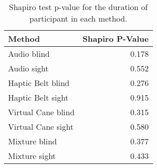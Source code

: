 
\begin{table}[!htb]
\centering
\caption{Shapiro test p-value for the duration of participant in each method.}
\label{tab:shapiro_duration}
\begin{tabular}{lr}
\toprule
            Method &  Shapiro P-Value \\
\midrule
       Audio blind &            0.178 \\
       Audio sight &            0.552 \\
 Haptic Belt blind &            0.276 \\
 Haptic Belt sight &            0.915 \\
Virtual Cane blind &            0.315 \\
Virtual Cane sight &            0.580 \\
     Mixture blind &            0.377 \\
     Mixture sight &            0.433 \\
\bottomrule
\end{tabular}
\end{table}

